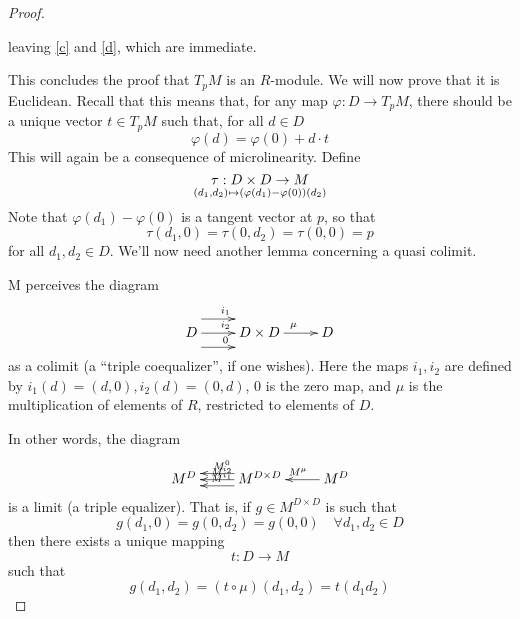 \begin{proof}
\begin{enumerate}
      leaving \ref{c} and \ref{d}, which are immediate.
  \end{enumerate}
  This concludes the proof that \( T_pM \) is an \( R \)-module. We will now prove that it is Euclidean. Recall that this means that, for any map \( \varphi:D\to T_pM \), there should be a unique vector \( t\in T_pM \) such that, for all \( d\in D \)
  \begin{equation*}
    \varphi(d) = \varphi(0) + d\cdot t
  \end{equation*}
  This will again be a consequence of microlinearity. Define
  \begin{equation*}
    \tau : D\times D\to M \atop (d_1,d_2)\mapsto (\varphi(d_1)-\varphi(0))(d_2)
  \end{equation*}
  Note that \( \varphi(d_1)-\varphi(0) \) is a tangent vector at \( p \), so that
  \begin{equation*}
    \tau(d_1,0) = \tau(0,d_2) = \tau(0,0) = p
  \end{equation*}
  for all \( d_1,d_2\in D \). We'll now need another lemma concerning a quasi colimit.

  \begin{lemma}
    M perceives the diagram
    \begin{equation}
      \xymatrix{
	D \ar@<1em>[r]^{i_1} \ar[r]^{i_2} \ar@<-1em>[r]^{0} & D\times D \ar[r]^{\mu} & D
      }
      \label{dg:3coequ}
    \end{equation}
    \label{lm:3coequ}
    as a colimit (a ``triple coequalizer'', if one wishes). Here the maps \( i_1,i_2 \) are defined by \( i_1(d)=(d,0), i_2(d)=(0,d) \), \( 0 \) is the zero map, and \( \mu \) is the multiplication of elements of \( R \), restricted to elements of \( D \).
  \end{lemma}

  In other words, the diagram
  \begin{equation*}
    \xymatrix{
      M^D & M^{D\times D} \ar@<1ex>[l]_{M^{i_1}} \ar[l]_{M^{i_2}} \ar@<-1ex>[l]_{M^{0}} & M^D \ar[l]_{M^{\mu}} 
    }
  \end{equation*}
  is a limit (a triple equalizer). That is, if \( g\in M^{D\times D} \) is such that
  \begin{equation}
    g(d_1,0)=g(0,d_2)=g(0,0) \quad \forall d_1,d_2\in D
    \label{eq:3equ}
  \end{equation}
  then there exists a unique mapping 
  \begin{equation*}
    t:D\to M
  \end{equation*}
  such that
  \begin{equation*}
    g(d_1,d_2) = (t\circ \mu)(d_1,d_2) = t(d_1d_2)
  \end{equation*}
  

\end{proof}

